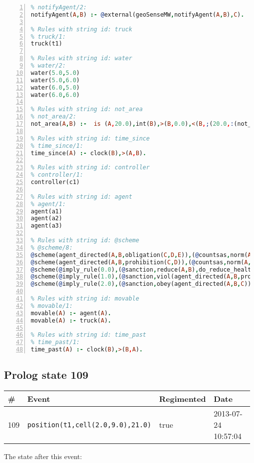 \documentclass[11pt]{article}\usepackage[utf8]{inputenc}\usepackage{geometry}
\begin{document}
\begin{lstlisting}[language=Prolog, numbers=left]
% Rules with string id: notifyAgent
% notifyAgent/2:
notifyAgent(A,B) :- @external(geoSenseMW,notifyAgent(A,B),C).

% Rules with string id: truck
% truck/1:
truck(t1)

% Rules with string id: water
% water/2:
water(5.0,5.0)
water(5.0,6.0)
water(6.0,5.0)
water(6.0,6.0)

% Rules with string id: not_area
% not_area/2:
not_area(A,B) :-  is (A,20.0),int(B),>(B,0.0),<(B,;(20.0,:(not_area(A,B), is (-(B),20.0)))),int(A),>(A,0.0),<(A,;(20.0,:(area(A,B),-(int(A))))),int(B),>(A,0.0),>(B,0.0),<(A,21.0),<(B,21.0).

% Rules with string id: time_since
% time_since/1:
time_since(A) :- clock(B),>(A,B).

% Rules with string id: controller
% controller/1:
controller(c1)

% Rules with string id: agent
% agent/1:
agent(a1)
agent(a2)
agent(a3)

% Rules with string id: @scheme
% @scheme/8:
@scheme(agent_directed(A,B,obligation(C,D,E)),(@countsas,norm(A,B,F,obligation(C,D,E)),F),false,(listTrue(C)),(time_past(D)),false,[plus(viol(agent_directed(A,B,obligation(C,D,E))))|[]],[plus(obey(agent_directed(A,B,obligation(C,D,E))))|[]])
@scheme(agent_directed(A,B,prohibition(C,D)),(@countsas,norm(A,B,E,prohibition(C,D)),E),(listTrue(C)),false,(false),false,[plus(viol(agent_directed(A,B,prohibition(C,D))))|[]],[plus(obey(agent_directed(A,B,prohibition(C,D))))|[]])
@scheme(@imply_rule(0.0),(@sanction,reduce(A,B),do_reduce_health(A,B),notifyAgent(A,changed(status))),true,false,false,false,[min(reduce(A,B))|[]],[])
@scheme(@imply_rule(1.0),(@sanction,viol(agent_directed(A,B,prohibition(C,D))),do_sanction(D)),true,false,false,false,[min(viol(agent_directed(A,B,prohibition(C,D))))|[]],[])
@scheme(@imply_rule(2.0),(@sanction,obey(agent_directed(A,B,C))),true,false,false,false,[min(obey(agent_directed(A,B,C)))|[]],[])

% Rules with string id: movable
% movable/1:
movable(A) :- agent(A).
movable(A) :- truck(A).

% Rules with string id: time_past
% time_past/1:
time_past(A) :- clock(B),>(B,A).

\end{lstlisting}
\clearpage 
\subsection{Prolog state 109}
\begin{table}[ht]
\centering 
\begin{tabular}{l l l l} 
\textbf{\#} & \textbf{Event} & \textbf{Regimented} & \textbf{Date} \\ [0.5ex] 
\hline
109&\texttt{position(t1,cell(2.0,9.0),21.0)}&true&2013-07-24 10:57:04\\ [1ex] \hline\end{tabular}
\end{table}
The state after this event:
\end{document}
